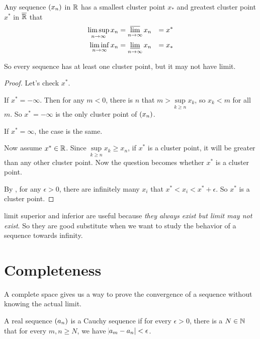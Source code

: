 \begin{theorem}
    Any sequence $\sequence{x_n}$ in $\mathbb{R}$ has a smallest cluster point $x_*$ and greatest cluster point $x^*$ in $\overline{\mathbb{R}}$ that
    \begin{equation}
        \begin{aligned}
            \limsup_{n \rightarrow \infty} x_n &= \varlimsup_{n\rightarrow \infty} x_n &= x^* \\
            \liminf_{n \rightarrow \infty} x_n &= \varliminf_{n\rightarrow \infty} x_n &= x_*
        \end{aligned}
    \end{equation}
    
    So every sequence has at least one cluster point, but it may not have limit.
\end{theorem}
\begin{proof}
    Let's check $x^*$. 
    
    If $x^* = - \infty$. Then for any $m < 0$, there is $n$ that $m > \underset{k \geq n}{\text{ sup }} x_k$, so $x_k < m$ for all $m$. So $x^* = -\infty$ is the only cluster point of $\sequence{x_n}$.
    
    If $x^* = \infty$, the case is the same.
        
    Now assume $x^* \in \mathbb{R}$. Since $\underset{k \geq n}{\text{ sup }} x_k \geq x_n$, if $x^*$ is a cluster point, it will be greater than any other cluster point. Now the question becomes whether $x^*$ is a cluster point. 
    
    By , for any $\epsilon>0$, there are infinitely many $x_i$ that $x^* < x_i < x^* + \epsilon$. So $x^*$ is a cluster point.
\end{proof}

limit superior and inferior are useful because \emph{they always exist but limit may not exist}. So they are good substitute when we want to study the behavior of a sequence towards infinity.




\section{Completeness}

A complete space gives us a way to prove the convergence of a sequence without knowing the actual limit.

\begin{definition}
    A real sequence $\sequence{a_n}$ is a Cauchy sequence if for every $\epsilon > 0$, there is a $N \in \mathbb{N}$ that for every $m,n \geq N$, we have $\abs{a_m - a_n} < \epsilon$.
\end{definition}

